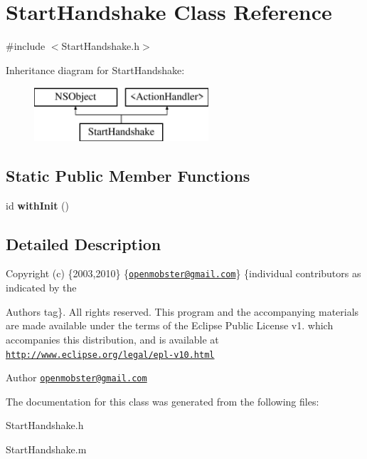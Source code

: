 \hypertarget{interface_start_handshake}{
\section{\-Start\-Handshake \-Class \-Reference}
\label{interface_start_handshake}
}


{\ttfamily \#include $<$\-Start\-Handshake.\-h$>$}

\-Inheritance diagram for \-Start\-Handshake\-:\begin{figure}[H]
\begin{center}
\leavevmode
\includegraphics[height=2.000000cm]{interface_start_handshake}
\end{center}
\end{figure}
\subsection*{\-Static \-Public \-Member \-Functions}
\begin{DoxyCompactItemize}
\item 
\hypertarget{interface_start_handshake_aaef2088f24f747ba711f99364a2b1d2d}{
id {\bfseries with\-Init} ()}
\label{interface_start_handshake_aaef2088f24f747ba711f99364a2b1d2d}

\end{DoxyCompactItemize}


\subsection{\-Detailed \-Description}
\-Copyright (c) \{2003,2010\} \{\href{mailto:openmobster@gmail.com}{\tt openmobster@gmail.\-com}\} \{individual contributors as indicated by the \begin{DoxyAuthor}{\-Authors}
tag\}. \-All rights reserved. \-This program and the accompanying materials are made available under the terms of the \-Eclipse \-Public \-License v1. which accompanies this distribution, and is available at \href{http://www.eclipse.org/legal/epl-v10.html}{\tt http\-://www.\-eclipse.\-org/legal/epl-\/v10.\-html}
\end{DoxyAuthor}
\begin{DoxyAuthor}{\-Author}
\href{mailto:openmobster@gmail.com}{\tt openmobster@gmail.\-com} 
\end{DoxyAuthor}


\-The documentation for this class was generated from the following files\-:\begin{DoxyCompactItemize}
\item 
\-Start\-Handshake.\-h\item 
\-Start\-Handshake.\-m\end{DoxyCompactItemize}
